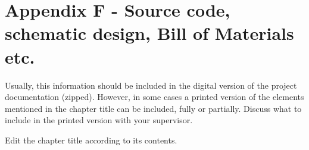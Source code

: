 \section{Appendix F - Source code, schematic design, Bill of Materials etc.}
Usually, this information should be included in the digital version of the project documentation (zipped). However, in some cases a printed version of the elements mentioned in the chapter title can be included, fully or partially. Discuss what to include in the printed version with your supervisor.

Edit the chapter title according to its contents.

\pagebreak